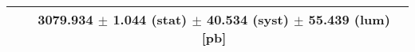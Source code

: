 \begin{tabular}{lc}
\hline
                               & 3079.934 $\pm$ 1.044 (stat) $\pm$ 40.534 (syst) $\pm$ 55.439 (lum) [pb]  \\
\hline
\end{tabular}
